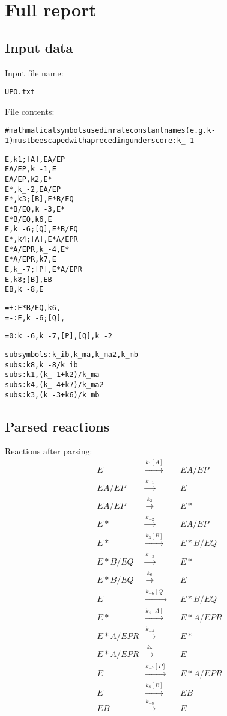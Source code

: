 \documentclass{article}%
\begin{document}
%
\normalsize%
\section{Full report}%
\label{sec:Full report}%
\subsection{Input data}%
\label{subsec:Input data}%
Input file name: %
\begin{alltt}
UPO.txt
\end{alltt}%
File contents:%
\begin{alltt}
#mathmatical symbols used in rate constant names (e.g. k-1) must be escaped with a preceding underscore: k_-1

E, k1; [A], EA/EP
EA/EP, k_-1, E
EA/EP, k2, E*
E*, k_-2, EA/EP
E*, k3; [B], E*B/EQ
E*B/EQ, k_-3, E*
E*B/EQ, k6, E
E, k_-6; [Q], E*B/EQ
E*, k4; [A], E*A/EPR
E*A/EPR, k_-4, E*
E*A/EPR, k7, E
E, k_-7; [P], E*A/EPR
E, k8; [B], EB
EB, k_-8, E

=+: E*B/EQ, k6,
=-: E, k_-6; [Q],

=0: k_-6, k_-7, [P], [Q], k_-2

subsymbols: k_ib, k_ma, k_ma2, k_mb
subs:k8, k_-8/k_ib
subs:k1, (k_-1 + k2)/k_ma
subs:k4, (k_-4+k7)/k_ma2
subs:k3, (k_-3+k6)/k_mb
\end{alltt}

%
\subsection{Parsed reactions}%
\label{subsec:Parsed reactions}%
Reactions after parsing: \newline%
%
\begin{align*}
&E & \xrightarrow{k_{1}[A]} & &EA/EP\\
&EA/EP & \xrightarrow{k_{-1}} & &E\\
&EA/EP & \xrightarrow{k_{2}} & &E*\\
&E* & \xrightarrow{k_{-2}} & &EA/EP\\
&E* & \xrightarrow{k_{3}[B]} & &E*B/EQ\\
&E*B/EQ & \xrightarrow{k_{-3}} & &E*\\
&E*B/EQ & \xrightarrow{k_{6}} & &E\\
&E & \xrightarrow{k_{-6}[Q]} & &E*B/EQ\\
&E* & \xrightarrow{k_{4}[A]} & &E*A/EPR\\
&E*A/EPR & \xrightarrow{k_{-4}} & &E*\\
&E*A/EPR & \xrightarrow{k_{7}} & &E\\
&E & \xrightarrow{k_{-7}[P]} & &E*A/EPR\\
&E & \xrightarrow{k_{8}[B]} & &EB\\
&EB & \xrightarrow{k_{-8}} & &E\\
\end{align*}
\end{document}
